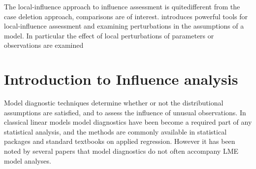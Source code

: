 \documentclass[12pt, a4paper]{report}
\theoremstyle{plain}
\theoremstyle{definition}
\theoremstyle{remark}
\begin{document}
The local-influence approach to influence assessment is quitedifferent from the case deletion approach, comparisons are of
interest.
\citet{cook86} introduces powerful tools for local-influence assessment and examining perturbations in the assumptions of a model. In particular the effect of local perturbations of parameters or observations are examined	
















\section{Introduction to Influence analysis} %
Model diagnostic techniques determine whether or not the distributional assumptions are satisfied, and to assess the influence of unusual observations. In classical linear models model diagnostics have been become a required part of any statistical analysis, and the methods are commonly available in statistical packages and standard textbooks on applied regression. However it has been noted by several papers that model diagnostics do not often accompany LME model analyses.
\end{document}
